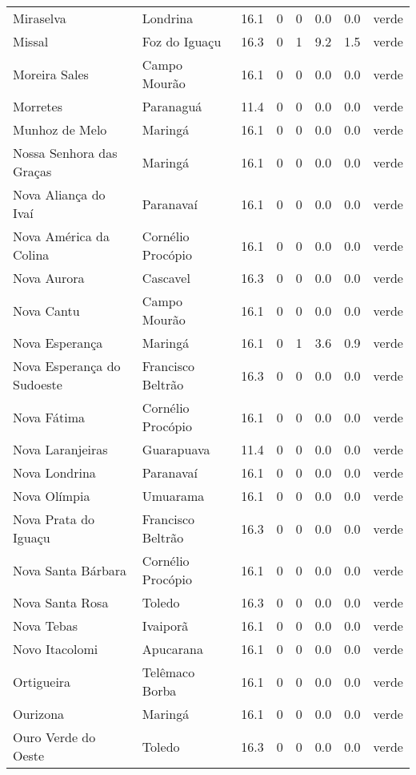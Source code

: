 \begin{longtable}{l|lllllll}
  Miraselva & Londrina & 16.1 & 0 & 0 & 0.0 & 0.0 & verde \\ 
  Missal & Foz do Iguaçu & 16.3 & 0 & 1 & 9.2 & 1.5 & verde \\ 
  Moreira Sales & Campo Mourão & 16.1 & 0 & 0 & 0.0 & 0.0 & verde \\ 
  Morretes & Paranaguá & 11.4 & 0 & 0 & 0.0 & 0.0 & verde \\ 
  Munhoz de Melo & Maringá & 16.1 & 0 & 0 & 0.0 & 0.0 & verde \\ 
  Nossa Senhora das Graças & Maringá & 16.1 & 0 & 0 & 0.0 & 0.0 & verde \\ 
  Nova Aliança do Ivaí & Paranavaí & 16.1 & 0 & 0 & 0.0 & 0.0 & verde \\ 
  Nova América da Colina & Cornélio Procópio & 16.1 & 0 & 0 & 0.0 & 0.0 & verde \\ 
  Nova Aurora & Cascavel & 16.3 & 0 & 0 & 0.0 & 0.0 & verde \\ 
  Nova Cantu & Campo Mourão & 16.1 & 0 & 0 & 0.0 & 0.0 & verde \\ 
  Nova Esperança & Maringá & 16.1 & 0 & 1 & 3.6 & 0.9 & verde \\ 
  Nova Esperança do Sudoeste & Francisco Beltrão & 16.3 & 0 & 0 & 0.0 & 0.0 & verde \\ 
  Nova Fátima & Cornélio Procópio & 16.1 & 0 & 0 & 0.0 & 0.0 & verde \\ 
  Nova Laranjeiras & Guarapuava & 11.4 & 0 & 0 & 0.0 & 0.0 & verde \\ 
  Nova Londrina & Paranavaí & 16.1 & 0 & 0 & 0.0 & 0.0 & verde \\ 
  Nova Olímpia & Umuarama & 16.1 & 0 & 0 & 0.0 & 0.0 & verde \\ 
  Nova Prata do Iguaçu & Francisco Beltrão & 16.3 & 0 & 0 & 0.0 & 0.0 & verde \\ 
  Nova Santa Bárbara & Cornélio Procópio & 16.1 & 0 & 0 & 0.0 & 0.0 & verde \\ 
  Nova Santa Rosa & Toledo & 16.3 & 0 & 0 & 0.0 & 0.0 & verde \\ 
  Nova Tebas & Ivaiporã & 16.1 & 0 & 0 & 0.0 & 0.0 & verde \\ 
  Novo Itacolomi & Apucarana & 16.1 & 0 & 0 & 0.0 & 0.0 & verde \\ 
  Ortigueira & Telêmaco Borba & 16.1 & 0 & 0 & 0.0 & 0.0 & verde \\ 
  Ourizona & Maringá & 16.1 & 0 & 0 & 0.0 & 0.0 & verde \\ 
  Ouro Verde do Oeste & Toledo & 16.3 & 0 & 0 & 0.0 & 0.0 & verde \\ 

\end{longtable}
